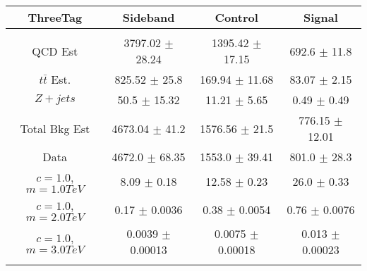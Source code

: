\begin{footnotesize} 
\begin{tabular}{c|c|c|c} 
ThreeTag & Sideband & Control & Signal \\ 
\hline\hline 
& & & \\ 
QCD Est & 3797.02 $\pm$ 28.24 & 1395.42 $\pm$ 17.15 & 692.6 $\pm$ 11.8\\ 
$t\bar{t}$ Est.  & 825.52 $\pm$ 25.8 & 169.94 $\pm$ 11.68 & 83.07 $\pm$ 2.15\\ 
$Z+jets$ & 50.5 $\pm$ 15.32 & 11.21 $\pm$ 5.65 & 0.49 $\pm$ 0.49\\ 
Total Bkg Est & 4673.04 $\pm$ 41.2 & 1576.56 $\pm$ 21.5 & 776.15 $\pm$ 12.01\\ 
Data & 4672.0 $\pm$ 68.35 & 1553.0 $\pm$ 39.41 & 801.0 $\pm$ 28.3\\ 
$c=1.0$,$m=1.0TeV$ & 8.09 $\pm$ 0.18 & 12.58 $\pm$ 0.23 & 26.0 $\pm$ 0.33\\ 
$c=1.0$,$m=2.0TeV$ & 0.17 $\pm$ 0.0036 & 0.38 $\pm$ 0.0054 & 0.76 $\pm$ 0.0076\\ 
$c=1.0$,$m=3.0TeV$ & 0.0039 $\pm$ 0.00013 & 0.0075 $\pm$ 0.00018 & 0.013 $\pm$ 0.00023\\ 
& & & \\ 
\hline\hline 
\end{tabular} 
\end{footnotesize} 
\newline 
